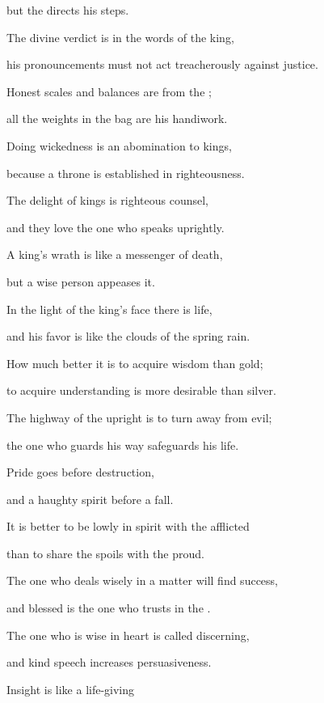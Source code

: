 {\par }{\Q but
the {}
directs
his steps.
\par }{\Q {}The divine verdict
is in the words
of the king,
\par }{\Q his pronouncements
must not
act
treacherously
against justice.
\par }{\Q {}Honest
scales
and balances
are from the
{};
\par }{\Q all
the weights
in the bag
are his handiwork.
\par }{\Q {}Doing
wickedness
is an abomination
to kings,
\par }{\Q because
a throne
is established
in righteousness.
\par }{\Q {}The delight
of kings
is righteous
counsel,
\par }{\Q and they love
the one who speaks
uprightly.
\par }{\Q {}A king’s
wrath
is like a messenger
of death,
\par }{\Q but
a wise
person appeases it.
\par }{\Q {}In the light
of the king’s
face
there is life,
\par }{\Q and his favor
is like the clouds
of the spring rain.
\par }{\Q {}How
much better
it is to acquire
wisdom
than gold;
\par }{\Q to acquire
understanding
is more desirable
than silver.
\par }{\Q {}The highway
of the upright
is to turn
away from evil;
\par }{\Q the one who guards
his way
safeguards
his life.
\par }{\Q {}Pride
goes before
destruction,
\par }{\Q and a haughty
spirit
before
a fall.
\par }{\Q {}It is better
to be lowly
in spirit
with
the afflicted
\par }{\Q than to share
the spoils
with
the proud.
\par }{\Q {}The one who deals wisely
in a matter
will find
success,
\par }{\Q and blessed
is the one who trusts
in the
{}.
\par }{\Q {}The one who is wise
in heart
is called
discerning,
\par }{\Q and kind
speech
increases
persuasiveness.
\par }{\Q {}Insight
is like a life-giving
}
